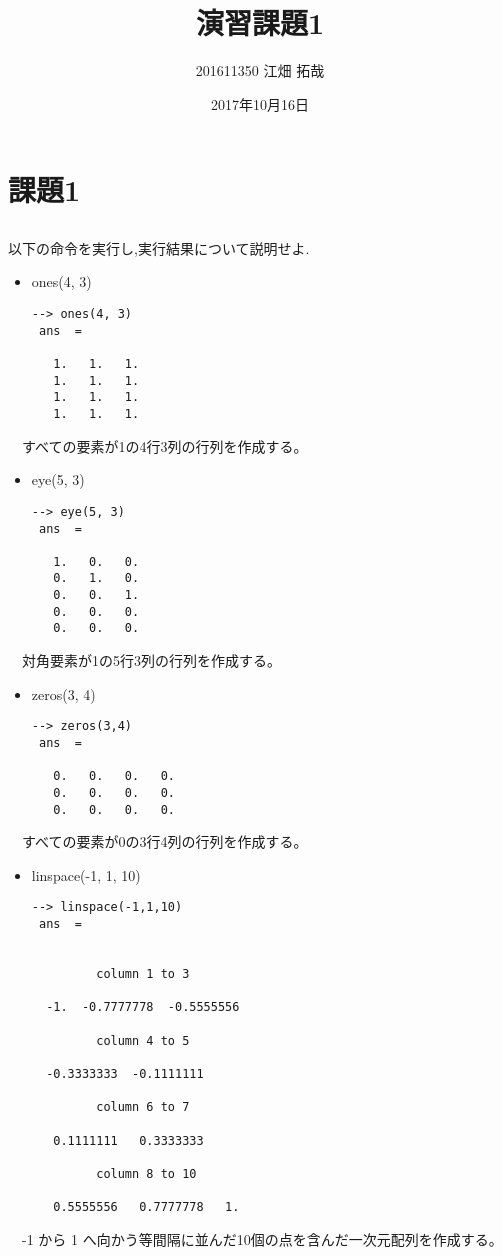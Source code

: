 \documentclass{jarticle}
\author{201611350 江畑 拓哉}
\date{2017年10月16日}
\title{演習課題1}
\begin{document}
\section{課題1}
\label{sec:org8ef3ccb}
\subsection{}
\label{sec:org44ac481}
以下の命令を実行し,実行結果について説明せよ.\\
\begin{itemize}
\item ones(4, 3)\\
\begin{verbatim}
--> ones(4, 3)
 ans  =

   1.   1.   1.
   1.   1.   1.
   1.   1.   1.
   1.   1.   1.
\end{verbatim}
\end{itemize}
　すべての要素が1の4行3列の行列を作成する。\\
\begin{itemize}
\item eye(5, 3)\\
\begin{verbatim}
--> eye(5, 3)
 ans  =

   1.   0.   0.
   0.   1.   0.
   0.   0.   1.
   0.   0.   0.
   0.   0.   0.
\end{verbatim}
\end{itemize}
　対角要素が1の5行3列の行列を作成する。\\
\begin{itemize}
\item zeros(3, 4)\\
\begin{verbatim}
--> zeros(3,4)
 ans  =

   0.   0.   0.   0.
   0.   0.   0.   0.
   0.   0.   0.   0.
\end{verbatim}
\end{itemize}
　すべての要素が0の3行4列の行列を作成する。\\
\begin{itemize}
\item linspace(-1, 1, 10)\\
\begin{verbatim}
--> linspace(-1,1,10)
 ans  =


         column 1 to 3

  -1.  -0.7777778  -0.5555556

         column 4 to 5

  -0.3333333  -0.1111111

         column 6 to 7

   0.1111111   0.3333333

         column 8 to 10

   0.5555556   0.7777778   1.
\end{verbatim}
\end{itemize}
　-1 から 1 へ向かう等間隔に並んだ10個の点を含んだ一次元配列を作成する。\\
\end{document}
